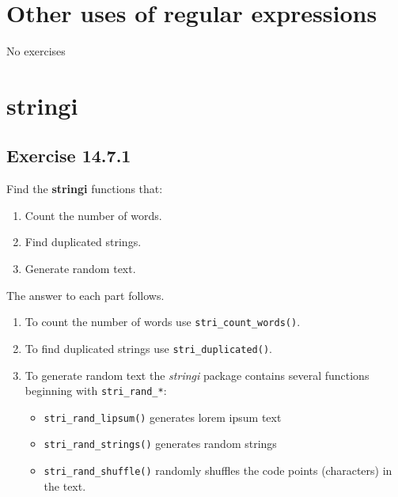 \documentclass[]{book}
\providecommand{\tightlist}{%
  \setlength{\itemsep}{0pt}\setlength{\parskip}{0pt}}
\theoremstyle{plain}
\theoremstyle{remark}
\theoremstyle{definition}
\theoremstyle{definition}
\theoremstyle{definition}
\theoremstyle{remark}
\begin{document}
\hypertarget{other-uses-of-regular-expressions}{%
\section{Other uses of regular
expressions}\label{other-uses-of-regular-expressions}}

No exercises

\hypertarget{stringi}{%
\section{stringi}\label{stringi}}

\hypertarget{exercise-14.7.1}{%
\subsection*{\texorpdfstring{Exercise
{14.7.1}}{Exercise 14.7.1}}\label{exercise-14.7.1}}

Find the \textbf{stringi} functions that:

\begin{enumerate}
\def\labelenumi{\arabic{enumi}.}
\tightlist
\item
  Count the number of words.
\item
  Find duplicated strings.
\item
  Generate random text.
\end{enumerate}

The answer to each part follows.

\begin{enumerate}
\def\labelenumi{\arabic{enumi}.}
\item
  To count the number of words use \texttt{stri\_count\_words()}.
\item
  To find duplicated strings use \texttt{stri\_duplicated()}.
\item
  To generate random text the \emph{stringi} package contains several
  functions beginning with \texttt{stri\_rand\_*}:

  \begin{itemize}
  \tightlist
  \item
    \texttt{stri\_rand\_lipsum()} generates lorem ipsum text
  \item
    \texttt{stri\_rand\_strings()} generates random strings
  \item
    \texttt{stri\_rand\_shuffle()} randomly shuffles the code points
    (characters) in the text.
  \end{itemize}
\end{enumerate}
\end{document}
